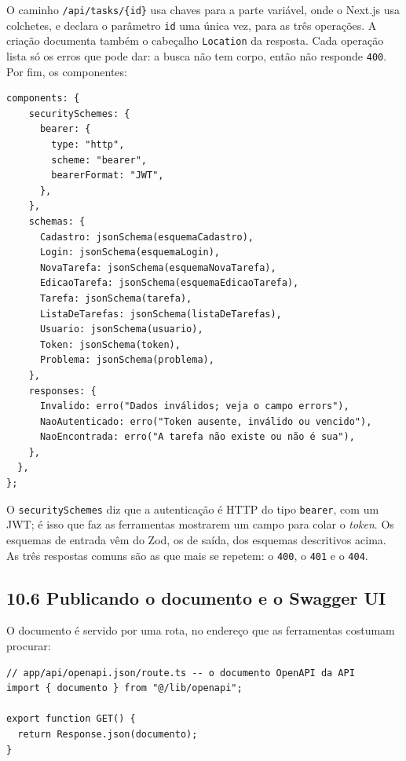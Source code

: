 O caminho \texttt{/api/tasks/\{id\}} usa chaves para a parte variável, onde o Next.js usa colchetes, e declara o parâmetro \texttt{id} uma única vez, para as três operações. A criação documenta também o cabeçalho \texttt{Location} da resposta. Cada operação lista só os erros que pode dar: a busca não tem corpo, então não responde \texttt{400}. Por fim, os componentes:

\begin{codigo}
\begin{Verbatim}[breaklines=true, breaksymbolleft={}, fontsize=\footnotesize]
  components: {
    securitySchemes: {
      bearer: {
        type: "http",
        scheme: "bearer",
        bearerFormat: "JWT",
      },
    },
    schemas: {
      Cadastro: jsonSchema(esquemaCadastro),
      Login: jsonSchema(esquemaLogin),
      NovaTarefa: jsonSchema(esquemaNovaTarefa),
      EdicaoTarefa: jsonSchema(esquemaEdicaoTarefa),
      Tarefa: jsonSchema(tarefa),
      ListaDeTarefas: jsonSchema(listaDeTarefas),
      Usuario: jsonSchema(usuario),
      Token: jsonSchema(token),
      Problema: jsonSchema(problema),
    },
    responses: {
      Invalido: erro("Dados inválidos; veja o campo errors"),
      NaoAutenticado: erro("Token ausente, inválido ou vencido"),
      NaoEncontrada: erro("A tarefa não existe ou não é sua"),
    },
  },
};
\end{Verbatim}
\end{codigo}

O \texttt{securitySchemes} diz que a autenticação é HTTP do tipo \texttt{bearer}, com um JWT; é isso que faz as ferramentas mostrarem um campo para colar o \textit{token}. Os esquemas de entrada vêm do Zod, os de saída, dos esquemas descritivos acima. As três respostas comuns são as que mais se repetem: o \texttt{400}, o \texttt{401} e o \texttt{404}.

\subsection{10.6 Publicando o documento e o Swagger UI}

O documento é servido por uma rota, no endereço que as ferramentas costumam procurar:

\begin{codigo}
\begin{Verbatim}[breaklines=true, breaksymbolleft={}, fontsize=\footnotesize]
// app/api/openapi.json/route.ts -- o documento OpenAPI da API
import { documento } from "@/lib/openapi";

export function GET() {
  return Response.json(documento);
}
\end{Verbatim}
\end{codigo}

